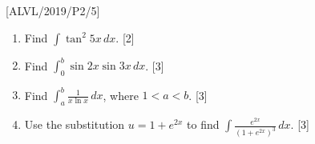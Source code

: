 \item {[}ALVL/2019/P2/5{]} 
\begin{enumerate}
\item Find $\int\tan^{2}5x\,dx$. \hfill{}{[}2{]}
\item Find $\int_{0}^{b}\sin2x\sin3x\,dx$. \hfill{}{[}3{]}
\item Find $\int_{a}^{b}\frac{1}{x\ln x}\,dx$, where $1<a<b$. \hfill{}
{[}3{]}
\item Use the substitution $u=1+e^{2x}$ to find $\int\frac{e^{2x}}{\left(1+e^{2x}\right)^{3}}\,dx$.
\hfill{} {[}3{]}
\end{enumerate}
